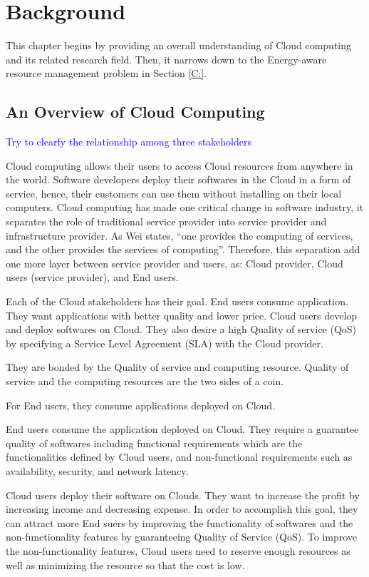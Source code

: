 \section{Background}

This chapter begins by providing an overall understanding of Cloud computing and its related research field.
Then, it narrows down to the Energy-aware resource management problem in Section \ref{C:}.


\subsection{An Overview of Cloud Computing}

\textcolor{Blue}{Try to clearfy the relationship among three stakeholders}

Cloud computing allows their users to access Cloud resources from anywhere in the world. Software developers deploy their softwares in the Cloud in a form of service, hence, their customers can use them without installing on their local computers. Cloud computing has made one critical change in software industry, it separates the role of traditional service provider into service provider and infrastructure provider. As Wei \cite{Wei:2010fn} states, ``one provides the computing of services, and the other provides the services of computing''. Therefore, this separation add one more layer between service provider and users, as: Cloud provider, Cloud users (service provider), and End users. 

Each of the Cloud stakeholders has their goal. End users consume application. They want applications with better quality and lower price. Cloud users develop and deploy softwares on Cloud. They also desire a high Quality of service (QoS) by specifying a Service Level Agreement (SLA) with the Cloud provider. 

They are bonded by the Quality of service and computing resource. Quality of service and the computing resources are the two sides of a coin. 


For End users, they consume applications deployed on Cloud. 




End users consume the application deployed on Cloud. They require a guarantee quality of softwares including functional requirements which are the functionalities defined by Cloud users, and non-functional requirements such as availability, security, and network latency.

Cloud users deploy their software on Clouds. They want to increase the profit by increasing income and decreasing expense. In order to accomplish this goal, they can attract more End suers by improving the functionality of softwares and the non-functionality features by guaranteeing Quality of Service (QoS). To improve the non-functionality features, Cloud users need to reserve enough resources as well as minimizing the resource so that the cost is low.

